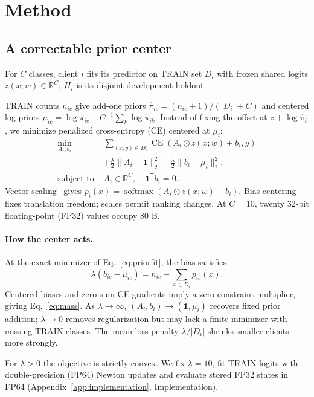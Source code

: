 \section{Method}

\subsection{A correctable prior center}
For $C$ classes, client $i$ fits its predictor on TRAIN set $D_i$ with frozen shared logits $z(x;w)\in\mathbb{R}^C$; $H_i$ is its disjoint development holdout.

TRAIN counts $n_{ic}$ give add-one priors $\widehat\pi_{ic}=(n_{ic}+1)/(|D_i|+C)$ and centered log-priors $\mu_{ic}=\log\widehat\pi_{ic}-C^{-1}\sum_k\log\widehat\pi_{ik}$.
Instead of fixing the offset at $z+\log\widehat\pi_i$, we minimize penalized cross-entropy (CE) centered at $\mu_i$:
\begin{equation}\label{eq:priorfit}
\begin{aligned}
\min_{A_i,b_i}\;&\sum_{(x,y)\in D_i}\operatorname{CE}(A_i\odot z(x;w)+b_i,y)\\
&+\frac{\lambda}{2}\|A_i-\mathbf{1}\|_2^2
 +\frac{\lambda}{2}\|b_i-\mu_i\|_2^2,\\
\text{subject to }&A_i\in\mathbb{R}^C,\quad\mathbf{1}^{\mathsf T}b_i=0.
\end{aligned}
\end{equation}
Vector scaling~\cite{guo2017calibration} gives $p_i(x)=\operatorname{softmax}(A_i\odot z(x;w)+b_i)$. Bias centering fixes translation freedom; scales permit ranking changes. At $C=10$, twenty 32-bit floating-point (FP32) values occupy 80 B.

\paragraph{How the center acts.}
At the exact minimizer of Eq.~\ref{eq:priorfit}, the bias satisfies
\begin{equation}\label{eq:mass}
\lambda(b_{ic}-\mu_{ic})
=n_{ic}-\sum_{x\in D_i}p_{ic}(x).
\end{equation}
Centered biases and zero-sum CE gradients imply a zero constraint multiplier, giving Eq.~\ref{eq:mass}. As $\lambda\to\infty$, $(A_i,b_i)\to(\mathbf{1},\mu_i)$ recovers fixed prior addition; $\lambda\to0$ removes regularization but may lack a finite minimizer with missing TRAIN classes. The mean-loss penalty $\lambda/|D_i|$ shrinks smaller clients more strongly.

For $\lambda>0$ the objective is strictly convex. We fix $\lambda=10$, fit TRAIN logits with double-precision (FP64) Newton updates and evaluate stored FP32 states in FP64 (Appendix~\ref{app:implementation}, Implementation).

